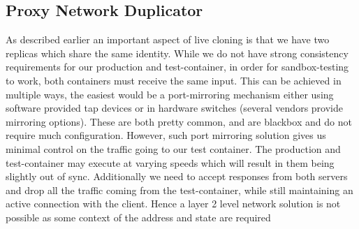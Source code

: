 

\subsection{Proxy Network Duplicator} 
\label{sec:proxyDuplicator}

As described earlier an important aspect of live cloning is that we have two replicas which share the same identity. 
While we do not have strong consistency requirements for our production and test-container, in order for sandbox-testing to work, both containers must receive the same input.
This can be achieved in multiple ways, the easiest would be a port-mirroring mechanism either using software provided tap devices or in hardware switches (several vendors provide mirroring options). 
These are both pretty common, and are blackbox and do not require much configuration.
However, such port mirroring solution gives us minimal control on the traffic going to our test container.
The production and test-container may execute at varying speeds which will result in them being slightly out of sync.
Additionally we need to accept responses from both servers and drop all the traffic coming from the test-container, while still maintaining an active connection with the client.
Hence a layer 2 level network solution is not possible as some context of the address and state are required

